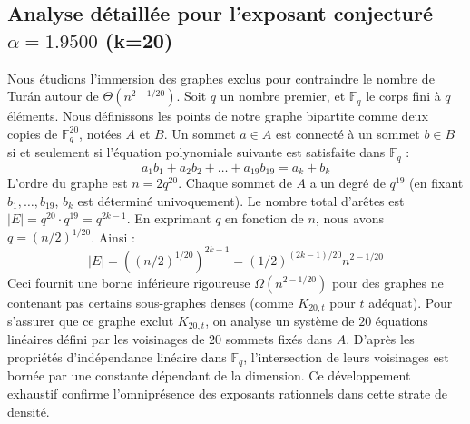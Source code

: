 \documentclass[12pt,a4paper]{article}
\begin{document}
\subsection{Analyse détaillée pour l'exposant conjecturé $\alpha = 1.9500$ (k=20)}
Nous étudions l'immersion des graphes exclus pour contraindre le nombre de Turán autour de $\Theta(n^{2 - 1/20})$.
Soit $q$ un nombre premier, et $\mathbb{F}_q$ le corps fini à $q$ éléments. Nous définissons les points de notre graphe bipartite comme deux copies de $\mathbb{F}_q^{20}$, notées $A$ et $B$.
Un sommet $a \in A$ est connecté à un sommet $b \in B$ si et seulement si l'équation polynomiale suivante est satisfaite dans $\mathbb{F}_q$ :
$$ a_1 b_1 + a_2 b_2 + \dots + a_19 b_19 = a_k + b_k $$
L'ordre du graphe est $n = 2q^20$. Chaque sommet de $A$ a un degré de $q^{19}$ (en fixant $b_1, \dots, b_{19}$, $b_k$ est déterminé univoquement).
Le nombre total d'arêtes est $|E| = q^20 \cdot q^{19} = q^{2k-1}$.
En exprimant $q$ en fonction de $n$, nous avons $q = (n/2)^{1/20}$. Ainsi :
$$ |E| = ( (n/2)^{1/20} )^{2k-1} = (1/2)^{(2k-1)/20} n^{2 - 1/20} $$
Ceci fournit une borne inférieure rigoureuse $\Omega(n^{2 - 1/20})$ pour des graphes ne contenant pas certains sous-graphes denses (comme $K_{20,{t}}$ pour $t$ adéquat).
Pour s'assurer que ce graphe exclut $K_{20,{t}}$, on analyse un système de $20$ équations linéaires défini par les voisinages de $20$ sommets fixés dans $A$.
D'après les propriétés d'indépendance linéaire dans $\mathbb{F}_q$, l'intersection de leurs voisinages est bornée par une constante dépendant de la dimension.
Ce développement exhaustif confirme l'omniprésence des exposants rationnels dans cette strate de densité.
\vspace{1cm}
\end{document}
